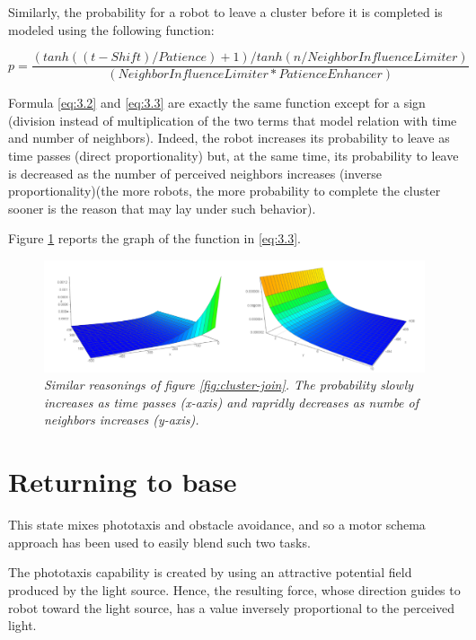 Similarly, the probability for a robot to leave a cluster before it is completed is modeled using the following function:

\begin{equation}
    p =  \frac{(tanh((t - Shift) / Patience) + 1) / tanh(n / NeighborInfluenceLimiter)}{(NeighborInfluenceLimiter * PatienceEnhancer)} \tag{3.3}\label{eq:3.3}
\end{equation}

Formula \ref{eq:3.2} and \ref{eq:3.3} are exactly the same function except for a sign (division instead of multiplication of the two terms that model relation with time and number of neighbors). Indeed, the robot increases its probability to leave as time passes (direct proportionality) but, at the same time, its probability to leave is decreased as the number of perceived neighbors increases (inverse proportionality)(the more robots, the more probability to complete the cluster sooner is the reason that may lay under such behavior). 

\noindent
Figure \ref{fig:cluster-leave} reports the graph of the function in \ref{eq:3.3}.

\begin{figure}[H]
\centering
\includegraphics[width=\linewidth]{images/cluster_leave.png}
\caption{\textit{Similar reasonings of figure \ref{fig:cluster-join}. The probability slowly increases as time passes (x-axis) and rapridly decreases as numbe of neighbors increases (y-axis).}}
\label{fig:cluster-leave}
\end{figure}

\section{Returning to base}

This state mixes phototaxis and obstacle avoidance, and so a motor schema approach has been used to easily blend such two tasks.

\smallskip
The phototaxis capability is created by using an attractive potential field produced by the light source. Hence, the resulting force, whose direction guides to robot toward the light source, has a value inversely proportional to the perceived light.

